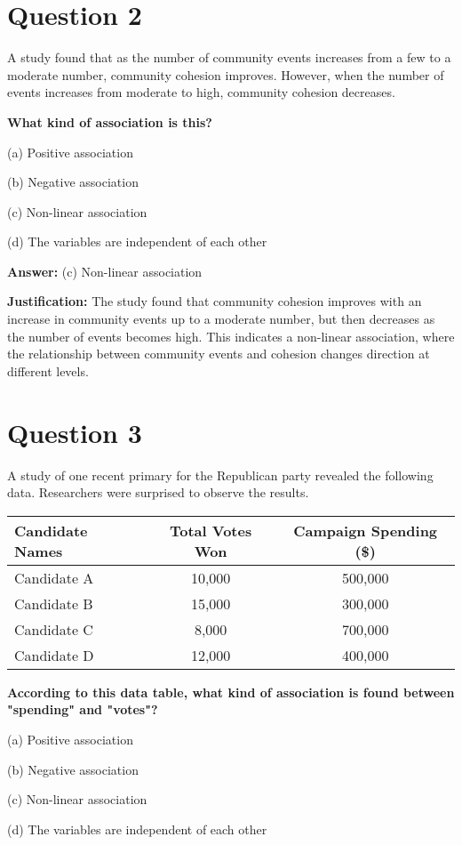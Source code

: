 \documentclass{article}
\begin{document}
\section*{Question 2}
A study found that as the number of community events increases from a few to a moderate number, community cohesion improves. However, when the number of events increases from moderate to high, community cohesion decreases.

\textbf{What kind of association is this?}

(a) Positive association

(b) Negative association

(c) Non-linear association

(d) The variables are independent of each other

\textbf{Answer:} (c) Non-linear association

\textbf{Justification:} The study found that community cohesion improves with an increase in community events up to a moderate number, but then decreases as the number of events becomes high. This indicates a non-linear association, where the relationship between community events and cohesion changes direction at different levels.

\section*{Question 3}
A study of one recent primary for the Republican party revealed the following data. Researchers were surprised to observe the results.

\begin{tabular}{|l|c|c|}
\hline
Candidate Names & Total Votes Won & Campaign Spending (\$) \\
\hline
Candidate A & 10,000 & 500,000 \\
Candidate B & 15,000 & 300,000 \\
Candidate C & 8,000 & 700,000 \\
Candidate D & 12,000 & 400,000 \\
\hline
\end{tabular}

\textbf{According to this data table, what kind of association is found between "spending" and "votes"?}

(a) Positive association

(b) Negative association

(c) Non-linear association

(d) The variables are independent of each other
\end{document}

